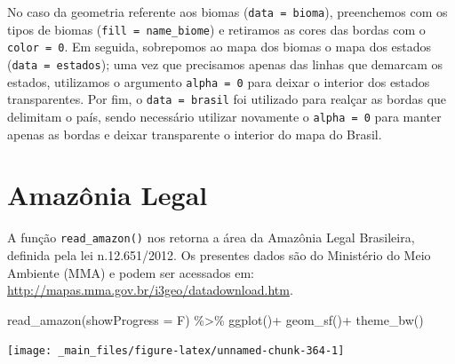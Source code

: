 \documentclass[
  brazilian,
]{book}
\newenvironment{Shaded}{\begin{snugshade}}{\end{snugshade}}
\newcommand{\AttributeTok}[1]{\textcolor[rgb]{0.77,0.63,0.00}{#1}}
\newcommand{\FunctionTok}[1]{\textcolor[rgb]{0.00,0.00,0.00}{#1}}
\newcommand{\NormalTok}[1]{#1}
\newcommand{\SpecialCharTok}[1]{\textcolor[rgb]{0.00,0.00,0.00}{#1}}
\begin{document}
No caso da geometria referente aos biomas (\texttt{data\ =\ bioma}), preenchemos com os tipos de biomas (\texttt{fill\ =\ name\_biome}) e retiramos as cores das bordas com o \texttt{color\ =\ 0}. Em seguida, sobrepomos ao mapa dos biomas o mapa dos estados (\texttt{data\ =\ estados}); uma vez que precisamos apenas das linhas que demarcam os estados, utilizamos o argumento \texttt{alpha\ =\ 0} para deixar o interior dos estados transparentes. Por fim, o \texttt{data\ =\ brasil} foi utilizado para realçar as bordas que delimitam o país, sendo necessário utilizar novamente o \texttt{alpha\ =\ 0} para manter apenas as bordas e deixar transparente o interior do mapa do Brasil.

\hypertarget{amazuxf4nia-legal}{%
\section{Amazônia Legal}\label{amazuxf4nia-legal}}

A função \texttt{read\_amazon()} nos retorna a área da Amazônia Legal Brasileira, definida pela lei n.12.651/2012. Os presentes dados são do Ministério do Meio Ambiente (MMA) e podem ser acessados em: \url{http://mapas.mma.gov.br/i3geo/datadownload.htm}.

\begin{Shaded}
\begin{Highlighting}[]
\FunctionTok{read\_amazon}\NormalTok{(}\AttributeTok{showProgress =}\NormalTok{ F) }\SpecialCharTok{\%\textgreater{}\%}
  \FunctionTok{ggplot}\NormalTok{()}\SpecialCharTok{+}
  \FunctionTok{geom\_sf}\NormalTok{()}\SpecialCharTok{+}
  \FunctionTok{theme\_bw}\NormalTok{()}
\end{Highlighting}
\end{Shaded}

\begin{center}\texttt{[image: \_main\_files/figure-latex/unnamed-chunk-364-1]} \end{center}
\end{document}
